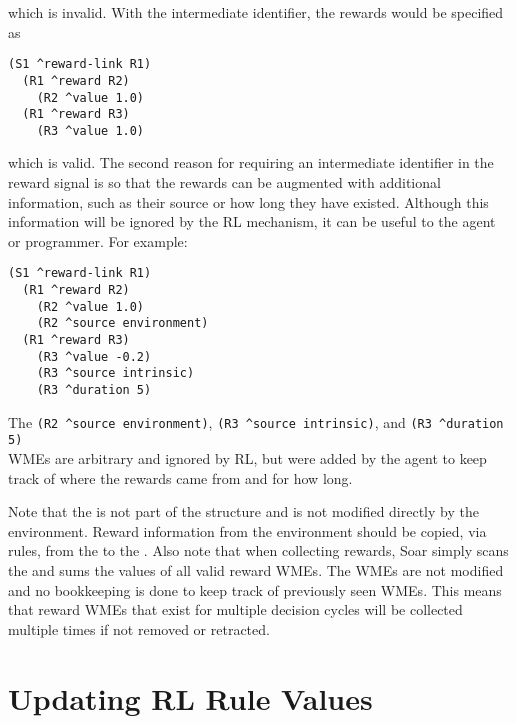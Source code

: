 which is invalid. With the intermediate identifier, the rewards would be specified as

\begin{verbatim}
(S1 ^reward-link R1)
  (R1 ^reward R2)
    (R2 ^value 1.0)
  (R1 ^reward R3)
    (R3 ^value 1.0)
\end{verbatim}

which is valid.
The second reason for requiring an intermediate identifier in the reward signal is so that the rewards can be augmented with additional information, such as their source or how long they have existed.
Although this information will be ignored by the RL mechanism, it can be useful to the agent or programmer.
For example:

\begin{verbatim}
(S1 ^reward-link R1)
  (R1 ^reward R2)
    (R2 ^value 1.0)
    (R2 ^source environment)
  (R1 ^reward R3)
    (R3 ^value -0.2)
    (R3 ^source intrinsic)
    (R3 ^duration 5)
\end{verbatim}  

The \verb=(R2 ^source environment)=, \verb=(R3 ^source intrinsic)=, and \verb=(R3 ^duration 5)= \\
WMEs are arbitrary and ignored by RL, but were added by the agent to keep 
track of where the rewards came from and for how long.

Note that the  is not part of the  structure and is not modified directly by the environment.
Reward information from the environment should be copied, via rules, from the  to the .
Also note that when collecting rewards, Soar simply scans the  and sums the values of all valid reward WMEs.
The WMEs are not modified and no bookkeeping is done to keep track of previously seen WMEs.
This means that reward WMEs that exist for multiple decision cycles will be collected multiple times if not removed or retracted.

\section{Updating RL Rule Values}
\label{RL-algo}

